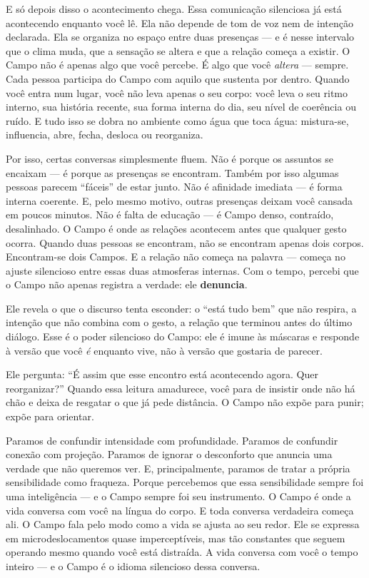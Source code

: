 \documentclass[12pt]{book}
\begin{document}
E só depois disso o acontecimento chega. Essa comunicação silenciosa já está acontecendo enquanto você lê. Ela não depende de tom de voz nem de intenção declarada. Ela se organiza no espaço entre duas presenças --- e é nesse intervalo que o clima muda, que a sensação se altera e que a relação começa a existir. O Campo não é apenas algo que você percebe. É algo que você \textit{altera} --- sempre. Cada pessoa participa do Campo com aquilo que sustenta por dentro. Quando você entra num lugar, você não leva apenas o seu corpo: você leva o seu ritmo interno, sua história recente, sua forma interna do dia, seu nível de coerência ou ruído. E tudo isso se dobra no ambiente como água que toca água: mistura-se, influencia, abre, fecha, desloca ou reorganiza.

Por isso, certas conversas simplesmente fluem. Não é porque os assuntos se encaixam --- é porque as presenças se encontram. Também por isso algumas pessoas parecem \enquote{fáceis} de estar junto. Não é afinidade imediata --- é forma interna coerente. E, pelo mesmo motivo, outras presenças deixam você cansada em poucos minutos. Não é falta de educação --- é Campo denso, contraído, desalinhado. O Campo é onde as relações acontecem antes que qualquer gesto ocorra. Quando duas pessoas se encontram, não se encontram apenas dois corpos. Encontram-se dois Campos. E a relação não começa na palavra --- começa no ajuste silencioso entre essas duas atmosferas internas. Com o tempo, percebi que o Campo não apenas registra a verdade: ele \textbf{denuncia}.

Ele revela o que o discurso tenta esconder: o \enquote{está tudo bem} que não respira, a intenção que não combina com o gesto, a relação que terminou antes do último diálogo. Esse é o poder silencioso do Campo: ele é imune às máscaras e responde à versão que você \textit{é} enquanto vive, não à versão que gostaria de parecer.

Ele pergunta: \enquote{É assim que esse encontro está acontecendo agora. Quer reorganizar?} Quando essa leitura amadurece, você para de insistir onde não há chão e deixa de resgatar o que já pede distância. O Campo não expõe para punir; expõe para orientar.

Paramos de confundir intensidade com profundidade. Paramos de confundir conexão com projeção. Paramos de ignorar o desconforto que anuncia uma verdade que não queremos ver. E, principalmente, paramos de tratar a própria sensibilidade como fraqueza. Porque percebemos que essa sensibilidade sempre foi uma inteligência --- e o Campo sempre foi seu instrumento. O Campo é onde a vida conversa com você na língua do corpo. E toda conversa verdadeira começa ali. O Campo fala pelo modo como a vida se ajusta ao seu redor. Ele se expressa em microdeslocamentos quase imperceptíveis, mas tão constantes que seguem operando mesmo quando você está distraída. A vida conversa com você o tempo inteiro --- e o Campo é o idioma silencioso dessa conversa.
\end{document}

